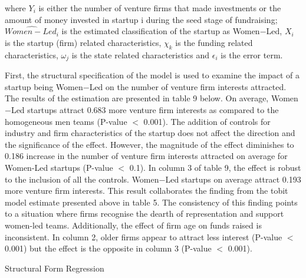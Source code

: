 \noindent where $Y_{i}$ is either the number of venture firms that made investments or the amount of money invested in startup i during the seed stage of fundraising;  $\widehat{Women-Led_i}$ is the estimated classification of the startup as Women$-$Led, $X_{i}$ is the startup (firm) related characteristics, $\chi_{k}$ is the funding related characteristics, $\omega_{j}$ is the state related characteristics and $\epsilon_{i}$ is the error term. 

First, the structural specification of the model is used to examine the impact of a startup being Women$-$Led on the number of venture firm interests attracted. The results of the estimation are presented in table 9 below. On average, Women$-$Led startups attract 0.683 more venture firm interests as compared to the homogeneous men teams (P-value $<$ 0.001). The addition of controls for industry and firm characteristics of the startup does not affect the direction and the significance of the effect. However, the magnitude of the effect diminishes to 0.186 increase in the number of venture firm interests attracted on average for Women-Led startups (P-value $<$ 0.1). In column 3 of table 9, the effect is robust to the inclusion of all the controls. Women$-$Led startups on average attract 0.193 more venture firm interests. This result collaborates the finding from the tobit model estimate presented above in table 5. The consistency of this finding points to a situation where firms recognise the dearth of representation and support women-led teams. Additionally, the effect of firm age on funds raised is inconsistent. In column 2, older firms appear to attract less interest (P-value $<$ 0.001) but the effect is the opposite in column 3 (P-value $<$ 0.001).

\begin{table}[H]
 \captionsetup{justification=raggedright,singlelinecheck=false}
    \caption{Structural Form Regression}
        
\end{table}

